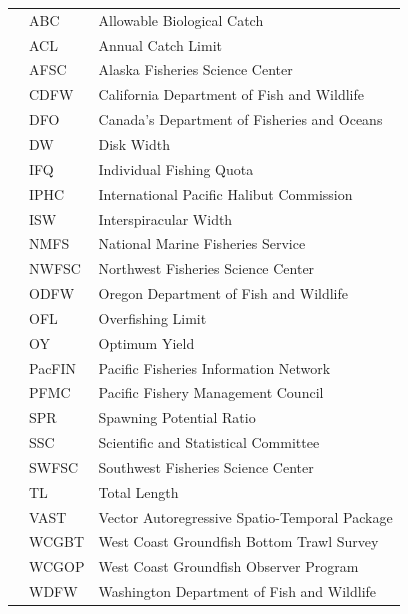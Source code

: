 \begin{center}
\begin{table}[ht]
\begin{tabular}{rll}
\hline
 &  ABC & Allowable Biological Catch \\ 
 &  ACL & Annual Catch Limit \\ 
 &  AFSC & Alaska Fisheries Science Center \\ 
 &  CDFW & California Department of Fish and Wildlife \\ 
 &  DFO & Canada's Department of Fisheries and Oceans \\
 &  DW & Disk Width \\
 &  IFQ & Individual Fishing Quota \\
 &  IPHC & International Pacific Halibut Commission \\
 &  ISW & Interspiracular Width \\
 &  NMFS & National Marine Fisheries Service \\
 &  NWFSC & Northwest Fisheries Science Center \\
 &  ODFW & Oregon Department of Fish and Wildlife \\
 &  OFL & Overfishing Limit \\
 &  OY & Optimum Yield \\
 &  PacFIN & Pacific Fisheries Information Network \\
 &  PFMC & Pacific Fishery Management Council \\
 &  SPR & Spawning Potential Ratio \\
 &  SSC & Scientific and Statistical Committee \\
 &  SWFSC & Southwest Fisheries Science Center \\
 &  TL & Total Length \\
 &  VAST & Vector Autoregressive Spatio-Temporal Package \\
 &  WCGBT & West Coast Groundfish Bottom Trawl Survey \\
 &  WCGOP & West Coast Groundfish Observer Program \\
 &  WDFW & Washington Department of Fish and Wildlife \\
   \hline
\end{tabular}
\end{table}

\renewcommand{\arraystretch}{1}

\maketitle

\setcounter{page}{1}
\end{center}



